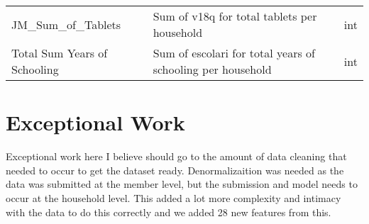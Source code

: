 \documentclass[11pt]{article}
\begin{document}
\begin{longtable}[]{@{}lll@{}}
\begin{minipage}[t]{0.63\columnwidth}
JM\_Sum\_of\_Tablets\strut
\end{minipage} & \begin{minipage}[t]{0.12\columnwidth}\raggedright\strut
Sum of v18q for total tablets per household\strut
\end{minipage} & \begin{minipage}[t]{0.16\columnwidth}\raggedright\strut
int\strut
\end{minipage}\tabularnewline
\begin{minipage}[t]{0.63\columnwidth}\raggedright\strut
Total Sum Years of Schooling\strut
\end{minipage} & \begin{minipage}[t]{0.12\columnwidth}\raggedright\strut
Sum of escolari for total years of schooling per household\strut
\end{minipage} & \begin{minipage}[t]{0.16\columnwidth}\raggedright\strut
int\strut
\end{minipage}\tabularnewline
\bottomrule
\end{longtable}

    \section{Exceptional Work}\label{exceptional-work}

Exceptional work here I believe should go to the amount of data cleaning
that needed to occur to get the dataset ready. Denormalizaition was
needed as the data was submitted at the member level, but the submission
and model needs to occur at the household level. This added a lot more
complexity and intimacy with the data to do this correctly and we added
28 new features from this.


    
    
    
    
\end{document}
